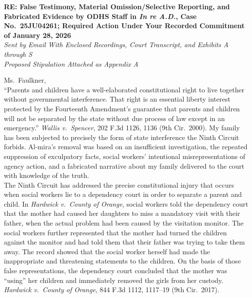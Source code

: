 \documentclass[10pt,a4paper,roman]{moderncv}
\begin{document}
	\bigskip
	\begin{center}
		\noindent\textbf{RE: False Testimony, Material Omission/Selective Reporting, and Fabricated Evidence by ODHS Staff in \textit{In re A.D.}, Case No.~25JU04261;
			Required Action Under Your Recorded Commitment of January 28, 2026}\\
		\textit{Sent by Email With Enclosed Recordings, Court Transcript, and Exhibits A through S}\\
		\textit{Proposed Stipulation Attached as Appendix A}
	\end{center}
	
	\vspace{1.0em}
	
	Ms.~Faulkner,\\
	
	\noindent``Parents and children have a well-elaborated constitutional right to live together without governmental interference. That right is an essential liberty interest protected by the Fourteenth Amendment's guarantee that parents and children will not be separated by the state without due process of law except in an emergency.'' \emph{Wallis v.~Spencer}, 202 F.3d 1126, 1136 (9th Cir.~2000). My family has been subjected to precisely the form of state interference the Ninth Circuit forbids. Al-mira's removal was based on an insufficient investigation, the repeated suppression of exculpatory facts, social workers' intentional misrepresentations of agency action, and a fabricated narrative about my family delivered to the court with knowledge of the truth.\\
	
	\noindent The Ninth Circuit has addressed the precise constitutional injury that occurs when social workers lie to a dependency court in order to separate a parent and child. In \emph{Hardwick v.~County of Orange}, social workers told the dependency court that the mother had caused her daughters to miss a mandatory visit with their father, when the actual problem had been caused by the visitation monitor. The social workers further represented that the mother had turned the children against the monitor and had told them that their father was trying to take them away. The record showed that the social worker herself had made the inappropriate and threatening statements to the children. On the basis of those false representations, the dependency court concluded that the mother was ``using'' her children and immediately removed the girls from her custody. \emph{Hardwick v.~County of Orange}, 844 F.3d 1112, 1117--19 (9th Cir.~2017).\\
	
\end{document}
